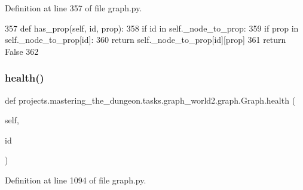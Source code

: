 Definition at line 357 of file graph.\+py.


\begin{DoxyCode}
357     \textcolor{keyword}{def }has\_prop(self, id, prop):
358         \textcolor{keywordflow}{if} id \textcolor{keywordflow}{in} self.\_node\_to\_prop:
359             \textcolor{keywordflow}{if} prop \textcolor{keywordflow}{in} self.\_node\_to\_prop[id]:
360                 \textcolor{keywordflow}{return} self.\_node\_to\_prop[id][prop]
361         \textcolor{keywordflow}{return} \textcolor{keyword}{False}
362 
\end{DoxyCode}
\mbox{\label{classprojects_1_1mastering__the__dungeon_1_1tasks_1_1graph__world2_1_1graph_1_1Graph_a94d0e8825af02aaf8de5f328a644b8c4}} 
\subsubsection{\texorpdfstring{health()}{health()}}
{\footnotesize\ttfamily def projects.\+mastering\+\_\+the\+\_\+dungeon.\+tasks.\+graph\+\_\+world2.\+graph.\+Graph.\+health (\begin{DoxyParamCaption}\item[{}]{self,  }\item[{}]{id }\end{DoxyParamCaption})}



Definition at line 1094 of file graph.\+py.


